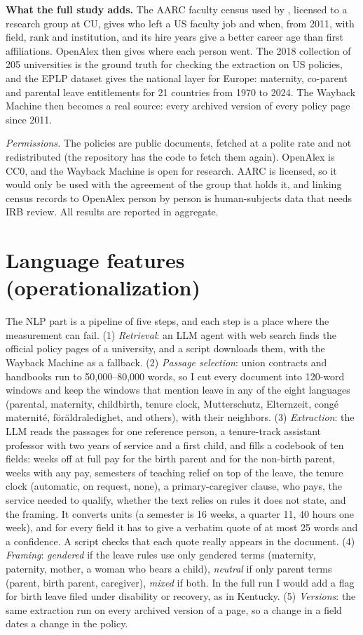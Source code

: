 \documentclass[10pt,twocolumn]{article}
\begin{document}
\textbf{What the full study adds.} The AARC faculty census used by \citet{spoon2023}, licensed to a research group at CU, gives who left a US faculty job and when, from 2011, with field, rank and institution, and its hire years give a better career age than first affiliations. OpenAlex then gives where each person went. The 2018 collection of 205 universities \citep{morgan2018} is the ground truth for checking the extraction on US policies, and the EPLP dataset \citep{spitzer2026} gives the national layer for Europe: maternity, co-parent and parental leave entitlements for 21 countries from 1970 to 2024. The Wayback Machine then becomes a real source: every archived version of every policy page since 2011.

\emph{Permissions.} The policies are public documents, fetched at a polite rate and not redistributed (the repository has the code to fetch them again). OpenAlex is CC0, and the Wayback Machine is open for research. AARC is licensed, so it would only be used with the agreement of the group that holds it, and linking census records to OpenAlex person by person is human-subjects data that needs IRB review. All results are reported in aggregate.

\section{Language features (operationalization)}
The NLP part is a pipeline of five steps, and each step is a place where the measurement can fail. (1) \emph{Retrieval}: an LLM agent with web search finds the official policy pages of a university, and a script downloads them, with the Wayback Machine as a fallback. (2) \emph{Passage selection}: union contracts and handbooks run to 50,000--80,000 words, so I cut every document into 120-word windows and keep the windows that mention leave in any of the eight languages (parental, maternity, childbirth, tenure clock, Mutterschutz, Elternzeit, congé maternité, föräldraledighet, and others), with their neighbors. (3) \emph{Extraction}: the LLM reads the passages for one reference person, a tenure-track assistant professor with two years of service and a first child, and fills a codebook of ten fields: weeks off at full pay for the birth parent and for the non-birth parent, weeks with any pay, semesters of teaching relief on top of the leave, the tenure clock (automatic, on request, none), a primary-caregiver clause, who pays, the service needed to qualify, whether the text relies on rules it does not state, and the framing. It converts units (a semester is 16 weeks, a quarter 11, 40 hours one week), and for every field it has to give a verbatim quote of at most 25 words and a confidence. A script checks that each quote really appears in the document. (4) \emph{Framing}: \emph{gendered} if the leave rules use only gendered terms (maternity, paternity, mother, a woman who bears a child), \emph{neutral} if only parent terms (parent, birth parent, caregiver), \emph{mixed} if both. In the full run I would add a flag for birth leave filed under disability or recovery, as in Kentucky. (5) \emph{Versions}: the same extraction run on every archived version of a page, so a change in a field dates a change in the policy.
\end{document}

